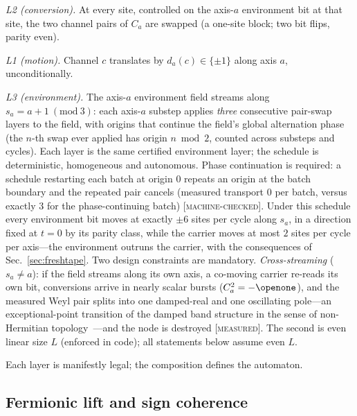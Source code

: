 \documentclass[aps,prd,twocolumn,superscriptaddress,nofootinbib,floatfix]{revtex4-2}
\newcommand{\evM}{\textnormal{\textsc{[machine-checked]}}}
\newcommand{\evX}{\textnormal{\textsc{[measured]}}}
\begin{document}
\emph{L2 (conversion).} At every site, controlled on the axis-$a$
environment bit at that site, the two channel pairs of $C_a$ are swapped
(a one-site block; two bit flips, parity even).

\emph{L1 (motion).} Channel $c$ translates by $d_a(c)\in\{\pm1\}$ along
axis $a$, unconditionally.

\emph{L3 (environment).} The axis-$a$ environment field streams along
$s_a=a{+}1\ (\mathrm{mod}\ 3)$: each axis-$a$ substep applies
\emph{three} consecutive pair-swap layers to the field, with origins
that continue the field's global alternation phase (the $n$-th swap ever
applied has origin $n\bmod2$, counted across substeps and cycles).
Each layer is the same certified environment layer; the schedule is
deterministic, homogeneous and autonomous. Phase continuation is
required: a schedule restarting each batch at origin $0$
repeats an origin at the batch boundary and the repeated pair cancels
(measured transport $0$ per batch, versus exactly $3$ for the
phase-continuing batch) \evM{}. Under this schedule every environment
bit moves at exactly $\pm6$ sites per cycle along $s_a$, in a direction
fixed at $t=0$ by its parity class, while the carrier moves at most $2$
sites per cycle per axis---the environment outruns the carrier, with the
consequences of Sec.~\ref{sec:freshtape}. Two design constraints are
mandatory. \emph{Cross-streaming} ($s_a\neq a$): if the field streams
along its own axis, a co-moving carrier re-reads its own bit,
conversions arrive in nearly scalar bursts ($C_a^2=-\openone$), and the
measured Weyl pair splits into one damped-real and one oscillating
pole---an exceptional-point transition of the damped band structure in
the sense of non-Hermitian topology~\cite{Bergholtz}---and the node is
destroyed \evX{}. The second is even linear size $L$ (enforced in
code); all statements below assume even $L$.

Each layer is manifestly legal; the composition defines the automaton.

\subsection{Fermionic lift and sign coherence}
\end{document}

